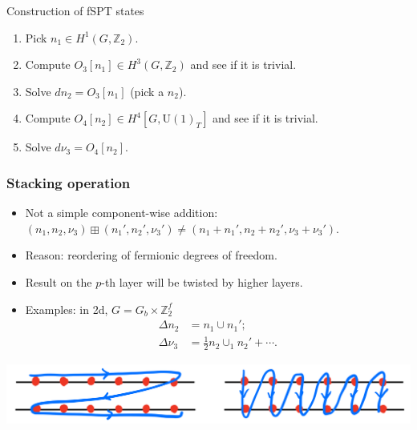 \documentclass[xcolor=table, 11pt, aspectratio=169]{beamer}
\begin{document}
\begin{frame}{Construction of fSPT states}
  \begin{enumerate}
  \item Pick $n_1\in H^1(G, \mathbb Z_2)$.
  \item Compute $O_3[n_1]\in H^3(G, \mathbb Z_2)$ and see if it is trivial.
  \item Solve $dn_2 = O_3[n_1]$ (pick a $n_2$).
  \item Compute $O_4[n_2]\in H^4[G, \mathrm U(1)_T]$ and see if it is trivial.
  \item Solve $d\nu_3 = O_4[n_2]$.
  \end{enumerate}
\end{frame}

\begin{frame}
  \frametitle{Stacking operation}
  \begin{itemize}
  \item Not a simple component-wise addition:
    $(n_1,n_2,\nu_3)\boxplus(n_1',n_2',\nu_3')\neq (n_1+n_1',n_2+n_2',\nu_3+\nu_3')$.
  \item Reason: reordering of fermionic degrees of freedom.
  \item Result on the $p$-th layer will be twisted by higher layers.
  \item Examples: in 2d, $G=G_b\times\mathbb Z_2^f$
    \begin{align*}
      \Delta n_2 &= n_1\cup n_1';\\
      \Delta \nu_3 &= \frac12n_2\cup_1n_2' + \cdots.
    \end{align*}
  \end{itemize}
  \begin{center}
    \includegraphics[height=2cm]{../chainmap/forder}
  \end{center}
\end{frame}
\end{document}
